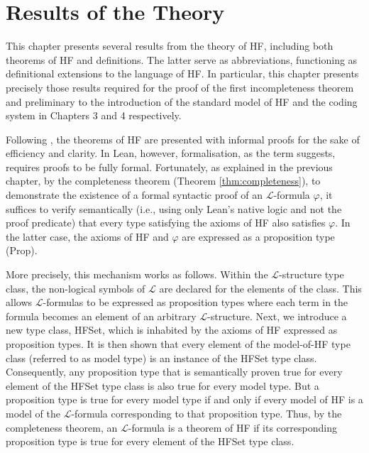 \chapter{Results of the Theory}

This chapter presents several results from the theory of HF, 
including both theorems of HF and definitions. The latter serve as abbreviations, 
functioning as definitional extensions to the language of HF.
In particular, this chapter presents precisely those results required for the proof
of the first incompleteness theorem and preliminary to the introduction of the standard model of HF
and the coding system in Chapters 3 and 4 respectively.

Following \cite{swierczkowski2003finite}, the theorems of HF are presented with informal proofs 
for the sake of efficiency and clarity. 
In Lean, however, formalisation, as the term suggests, requires proofs to be fully formal. 
Fortunately, as explained in the previous chapter, by the completeness theorem 
(Theorem \ref{thm:completeness}), to demonstrate the existence of a formal syntactic proof of 
an $\mathcal{L}$-formula $\varphi$, 
it suffices to verify semantically 
(i.e., using only Lean's native logic and not the proof predicate) that 
every type satisfying the axioms of HF also satisfies $\varphi$. 
In the latter case, the axioms of HF and $\varphi$ are expressed as a proposition type 
({\ttfamily \small Prop}).

More precisely, this mechanism works as follows.
Within the $\mathcal{L}$-structure type class, the non-logical symbols of $\mathcal{L}$ are 
declared for the elements of the class. 
This allows $\mathcal{L}$-formulas to be expressed
as proposition types where each term in the formula becomes an element of an 
arbitrary $\mathcal{L}$-structure. Next, we introduce a new type class, {\ttfamily \small HFSet}, 
which is inhabited by the axioms of HF expressed as proposition types. 
It is then shown that every element of the model-of-HF type class 
(referred to as model type) is an instance of the {\ttfamily \small HFSet} type class.
Consequently, any proposition type that is semantically proven true for every element of 
the {\ttfamily \small HFSet} type class is also true for every model type.
But a proposition type is true for every model type if and only if 
every model of HF is a model of the $\mathcal{L}$-formula corresponding to that proposition type.
Thus, by the completeness theorem, an $\mathcal{L}$-formula is a theorem of HF if its corresponding 
proposition type is true for every element of the {\ttfamily \small HFSet} type class.

